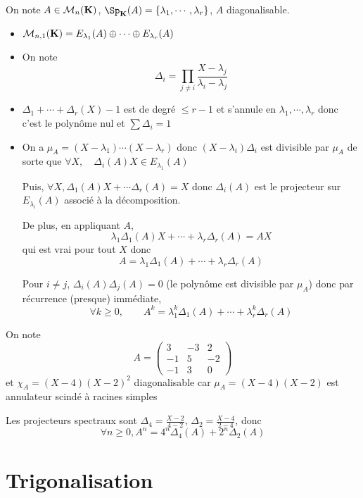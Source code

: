 On note $A\in\mathcal M_n(\mathbf K)$, $\Sp_{\K}(A)=\{\lambda_1, \cdots, \lambda_r\}$, $A$ diagonalisable. \begin{itemize}
    \item $\mathcal M_{n, 1}(\mathbf K)=E_{\lambda_1}(A)\oplus\cdots \oplus E_{\lambda_r}(A)$
    \item On note \[
            \Delta_i=\prod_{j\neq i}\frac{X-\lambda_j}{\lambda_i-\lambda_j}
        \]
    \item $\Delta_1+\cdots +\Delta_r(X)-1$ est de degré $\leq r-1$ et s'annule en $\lambda_1, \cdots, \lambda_r$ donc c'est le polynôme nul et $\sum \Delta_i=1$
    \item On a $\mu_A=(X-\lambda_1)\cdots (X-\lambda_r)$ donc $(X-\lambda_i)\Delta_i$ est divisible par $\mu_A$ de sorte que $\forall X, \quad \Delta_i(A)X\in E_{\lambda_1}(A)$

        Puis, $\forall X, \Delta_1(A)X+\cdots \Delta_r(A)=X$ donc $\Delta_i(A)$ est le projecteur sur $E_{\lambda_i}(A)$ associé à la décomposition.

        De plus, en appliquant $A$, \[
            \lambda_1\Delta_1(A)X+\cdots + \lambda_r\Delta_r(A)=AX
        \]
        qui est vrai pour tout $X$ donc \[
            A=\lambda_1\Delta_1(A)+\cdots +\lambda_r\Delta_r(A)
        \]

        Pour $i\neq j$, $\Delta_i(A)\Delta_j(A)=0$ (le polynôme est divisible par $\mu_A$) donc par récurrence (presque) immédiate, \[
            \forall k\geq 0, \qquad A^k=\lambda_1^k\Delta_1(A)+\cdots +\lambda_r^k\Delta_r(A)
        \]
\end{itemize}

\begin{ex}
    On note \[
        A= \begin{pmatrix}
            3 & -3 & 2 \\
            -1 & 5 & -2 \\
            -1 & 3 & 0
        \end{pmatrix}
    \]
    et $\chi_A=(X-4)(X-2)^2$ diagonalisable car $\mu_A=(X-4)(X-2)$ est annulateur scindé à racines simples

    Les projecteurs spectraux sont $\Delta_4=\frac{X-2}{4-2}$, $\Delta_2=\frac{X-4}{2-4}$, donc \[
        \forall n\geq 0, A^n=4^n\Delta_4(A)+2^n\Delta_2(A)
    \]
\end{ex}

\section{Trigonalisation}

